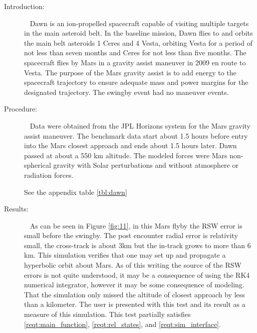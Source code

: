 \label{test:dawn}
\begin{description}
\item[Introduction:] \ \newline
Dawn is an ion-propelled spacecraft capable of visiting multiple targets in the main asteroid belt.
In the baseline mission, Dawn flies to and orbits the main belt asteroids 1 Ceres and 4 Vesta,
orbiting Vesta for a period of not less than seven months and Ceres for not less than five months.
The spacecraft flies by Mars in a gravity assist maneuver in 2009 en route to Vesta. The purpose of
the Mars gravity assist is to add energy to the spacecraft trajectory to ensure adequate mass and
power margins for the designated trajectory. The swingby event had no maneuver events.
\item[Procedure:]\ \newline
Data were obtained from the JPL Horizons system for the Mars gravity assist maneuver. The benchmark
data start about 1.5 hours before entry into the Mars closest approach and ends about 1.5 hours later.
Dawn passed at about a 550 km altitude. The modeled forces were Mars non-spherical gravity with Solar
perturbations and without atmosphere or radiation forces.

See the appendix table \ref{tbl:dawn}
\item[Results:]\ \newline
As can be seen in Figure \ref{fig:11}, in this Mars flyby the RSW error is small before the swingby.
The post encounter radial error is relativity small, the cross-track is about 3km but the in-track
grows to more than 6 km. This simulation verifies that one may set up and propagate a hyperbolic
orbit about Mars. As of this writing the source of the RSW errors is not quite understood, it may
be a consequence of using the RK4 numerical integrator, however it may be some consequence of modeling.
That the simulation only missed the altitude of closest approach by less than a kilometer. The user
is presented with this test and its result as a measure of this simulation.  This test partially
satisfies \ref{reqt:main_function}, \ref{reqt:rel_states}, and \ref{reqt:sim_interface}.



\end{description}
